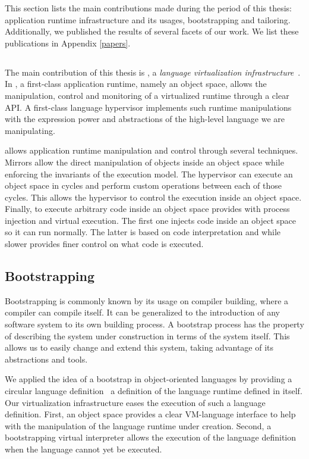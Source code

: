 This section lists the main contributions made during the period of this thesis: \Vtt application runtime infrastructure and its usages, bootstrapping and tailoring. Additionally, we published the results of several facets of our work. We list these publications in Appendix \ref{papers}.

\subsection{\Vtt}
The main contribution of this thesis is \Vtt, a \emph{language virtualization infrastructure}~\cite{Poli13a}. In \Vtt, a first-class application runtime, namely an object space, allows the manipulation, control and monitoring of a virtualized runtime through a clear API. A first-class language hypervisor implements such runtime manipulations with the expression power and abstractions of the high-level language we are manipulating.

\Vtt allows application runtime manipulation and control through several techniques. Mirrors allow the direct manipulation of objects inside an object space while enforcing the invariants of the \VM execution model. The hypervisor can execute an object space in cycles and perform custom operations between each of those cycles. This allows the hypervisor to control the execution inside an object space. Finally, to execute arbitrary code inside an object space \Vtt provides with process injection and virtual execution. The first one injects code inside an object space so it can run normally. The latter is based on code interpretation and while slower provides finer control on what code is executed. 

\subsection{Bootstrapping}
Bootstrapping is commonly known by its usage on compiler building, where a compiler can compile itself.
It can be generalized to the introduction of any software system to its own building process.
A bootstrap process has the property of describing the system under construction in terms of the system itself. This allows us to easily change and extend this system, taking advantage of its abstractions and tools.

We applied the idea of a bootstrap in object-oriented languages by providing a circular language definition~\cite{Poli14c} \ie a definition of the language runtime defined in itself.
Our virtualization infrastructure eases the execution of such a language definition. First, an object space provides a clear VM-language interface to help with the manipulation of the language runtime under creation. Second, a bootstrapping virtual interpreter allows the execution of the language definition when the language cannot yet be executed.

